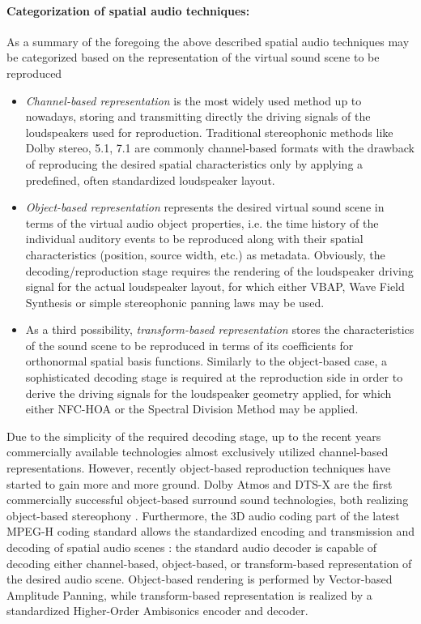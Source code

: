 \paragraph{Categorization of spatial audio techniques:}
As a summary of the foregoing the above described spatial audio techniques may be categorized based on the representation of the virtual sound scene to be reproduced \cite{Spors2013:Survey}
\begin{itemize}
\item \emph{Channel-based representation} is the most widely used method up to nowadays, storing and transmitting directly the driving signals of the loudspeakers used for reproduction.
Traditional stereophonic methods like Dolby stereo, 5.1, 7.1 are commonly channel-based formats with the drawback of reproducing the desired spatial characteristics only by applying a predefined, often standardized loudspeaker layout.
\item \emph{Object-based representation} represents the desired virtual sound scene in terms of the virtual audio object properties, i.e. the time history of the individual auditory events to be reproduced along with their spatial characteristics (position, source width, etc.) as metadata.
Obviously, the decoding/reproduction stage requires the rendering of the loudspeaker driving signal for the actual loudspeaker layout, for which either VBAP, Wave Field Synthesis or simple stereophonic panning laws may be used.
\item As a third possibility, \emph{transform-based representation} stores the characteristics of the sound scene to be reproduced in terms of its coefficients for orthonormal spatial basis functions.
Similarly to the object-based case, a sophisticated decoding stage is required at the reproduction side in order to derive the driving signals for the loudspeaker geometry applied, for which either NFC-HOA or the Spectral Division Method may be applied.
\end{itemize}
Due to the simplicity of the required decoding stage, up to the recent years commercially available technologies almost exclusively utilized channel-based representations.
However, recently object-based reproduction techniques have started to gain more and more ground.
Dolby Atmos and DTS-X are the first commercially successful object-based surround sound technologies, both realizing object-based stereophony \cite{Atmos}.
Furthermore, the 3D audio coding part of the latest MPEG-H coding standard allows the standardized encoding and transmission and decoding of spatial audio scenes \cite{herre2015mpeg, 7056445}:
the standard audio decoder is capable of decoding either channel-based, object-based, or transform-based representation of the desired audio scene.
Object-based rendering is performed by Vector-based Amplitude Panning, while transform-based representation is realized by a standardized Higher-Order Ambisonics encoder and decoder.

